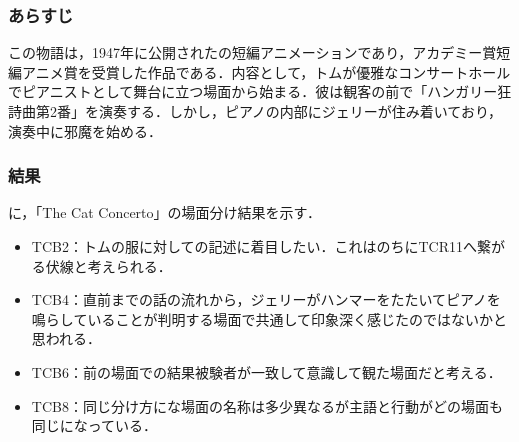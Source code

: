 \subsubsection{あらすじ}
この物語は，1947年に公開された\tomjerry の短編アニメーションであり，アカデミー賞短編アニメ賞を受賞した作品である．内容として，トムが優雅なコンサートホールでピアニストとして舞台に立つ場面から始まる．彼は観客の前で「ハンガリー狂詩曲第2番」を演奏する．しかし，ピアノの内部にジェリーが住み着いており，演奏中に邪魔を始める．


\subsubsection{結果}
に，「The Cat Concerto」の場面分け結果を示す．


\begin{itemize}
	\item TCB2：トムの服に対しての記述に着目したい．これはのちにTCR11へ繋がる伏線と考えられる．
	\item TCB4：直前までの話の流れから，ジェリーがハンマーをたたいてピアノを鳴らしていることが判明する場面で共通して印象深く感じたのではないかと思われる．
	\item TCB6：前の場面での結果被験者が一致して意識して観た場面だと考える．
	\item TCB8：同じ分け方にな場面の名称は多少異なるが主語と行動がどの場面も同じになっている．
\end{itemize}


